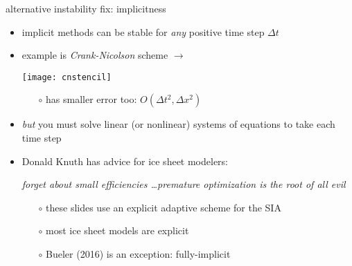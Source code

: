 \begin{frame}{alternative instability fix: implicitness}

\begin{itemize}
\item \alert{implicit} methods can be stable for \emph{any} positive time step $\Delta t$
\item example is \emph{Crank-Nicolson} scheme $\longrightarrow$

\vspace{-7mm}
\hfill \texttt{[image: cnstencil]}

\vspace{-5mm}
    \begin{itemize}
    \item[$\circ$] has smaller error too: $O(\Delta t^2,\Delta x^2)$
    \end{itemize}
\item \emph{but} you must solve linear (or nonlinear) systems of equations to take each time step

\bigskip

\small
\item Donald Knuth has advice for ice sheet modelers:

\begin{center}
\emph{forget about small efficiencies \dots premature optimization is the root of all evil}
\end{center}

    \begin{itemize}
    \item[$\circ$] these slides use an explicit adaptive scheme for the SIA
    \item[$\circ$] most ice sheet models are explicit
    \item[$\circ$] Bueler (2016) is an exception: fully-implicit 
    \end{itemize}
\end{itemize}
\end{frame}


